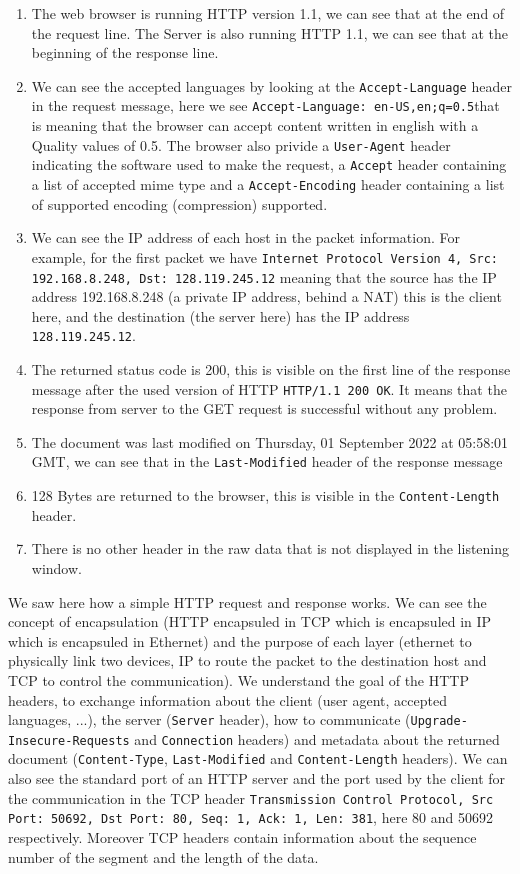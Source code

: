 \documentclass[a4paper,11pt,final]{report}
\begin{document}
\begin{enumerate}
\item The web browser is running HTTP version 1.1, we can see that at the end of the request line. The Server is also running HTTP 1.1, we can see that at the beginning of the response line. 
\item We can see the accepted languages by looking at the \texttt{Accept-Language} header in the request message, here we see \texttt{Accept-Language: en-US,en;q=0.5}that is meaning that the browser can accept content written in english with a Quality values of 0.5. The browser also privide a \texttt{User-Agent} header indicating the software used to make the request, a \texttt{Accept} header containing a list of accepted mime type and a \texttt{Accept-Encoding} header containing a list of supported encoding (compression) supported.
\item We can see the IP address of each host in the packet information. For example, for the first packet we have \texttt{Internet Protocol Version 4, Src: 192.168.8.248, Dst: 128.119.245.12} meaning that the source has the IP address 192.168.8.248 (a private IP address, behind a NAT) this is the client here, and the destination (the server here) has the IP address \texttt{128.119.245.12}.
\item The returned status code is 200, this is visible on the first line of the response message after the used version of HTTP \texttt{HTTP/1.1 200 OK}. It means that the response from server to the GET request is successful without any problem.
\item The document was last modified on Thursday, 01 September 2022 at 05:58:01 GMT, we can see that in the \texttt{Last-Modified} header of the response message
\item 128 Bytes are returned to the browser, this is visible in the \texttt{Content-Length} header.
\item There is no other header in the raw data that is not displayed in the listening window.
\end{enumerate}

We saw here how a simple HTTP request and response works. We can see the concept of encapsulation (HTTP encapsuled in TCP which is encapsuled in IP which is encapsuled in Ethernet) and the purpose of each layer (ethernet to physically link two devices, IP to route the packet to the destination host and TCP to control the communication). We understand the goal of the HTTP headers, to exchange information about the client (user agent, accepted languages, ...), the server (\texttt{Server} header), how to communicate (\texttt{Upgrade-Insecure-Requests} and \texttt{Connection} headers) and metadata about the returned document (\texttt{Content-Type}, \texttt{Last-Modified} and \texttt{Content-Length} headers). We can also see the standard port of an HTTP server and the port used by the client for the communication in the TCP header \texttt{Transmission Control Protocol, Src Port: 50692, Dst Port: 80, Seq: 1, Ack: 1, Len: 381}, here 80 and 50692 respectively. Moreover TCP headers contain information about the sequence number of the segment and the length of the data.
\end{document}
